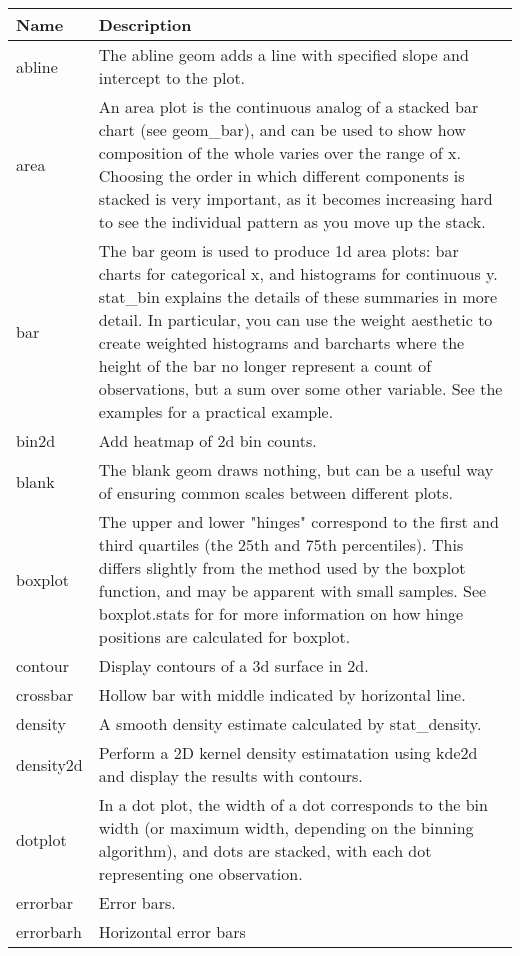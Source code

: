 \begin{table}[ht]
\centering
\begin{tabular}{ll}
  \hline
Name & Description \\ 
  \hline
abline & The abline geom adds a line with specified slope and intercept to the plot. \\ 
  area & An area plot is the continuous analog of a stacked bar chart (see geom\_bar), and can be used to show how composition of the whole varies over the range of x. Choosing the order in which different components is stacked is very important, as it becomes increasing hard to see the individual pattern as you move up the stack. \\ 
  bar & The bar geom is used to produce 1d area plots: bar charts for categorical x, and histograms for continuous y. stat\_bin explains the details of these summaries in more detail. In particular, you can use the weight aesthetic to create weighted histograms and barcharts where the height of the bar no longer represent a count of observations, but a sum over some other variable. See the examples for a practical example. \\ 
  bin2d & Add heatmap of 2d bin counts. \\ 
  blank & The blank geom draws nothing, but can be a useful way of ensuring common scales between different plots. \\ 
  boxplot & The upper and lower "hinges" correspond to the first and third quartiles (the 25th and 75th percentiles). This differs slightly from the method used by the boxplot function, and may be apparent with small samples. See boxplot.stats for for more information on how hinge positions are calculated for boxplot. \\ 
  contour & Display contours of a 3d surface in 2d. \\ 
  crossbar & Hollow bar with middle indicated by horizontal line. \\ 
  density & A smooth density estimate calculated by stat\_density. \\ 
  density2d & Perform a 2D kernel density estimatation using kde2d and display the results with contours. \\ 
  dotplot & In a dot plot, the width of a dot corresponds to the bin width (or maximum width, depending on the binning algorithm), and dots are stacked, with each dot representing one observation. \\ 
  errorbar & Error bars. \\ 
  errorbarh & Horizontal error bars \\ 

\end{tabular}
\end{table}
